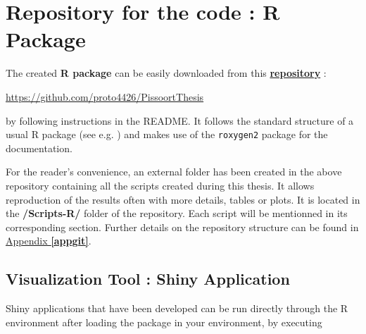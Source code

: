 \section*{Repository for the code : R Package}

The created \textbf{R package} can be easily downloaded from this \href{https://github.com/proto4426/PissoortThesis}{\textbf{repository}} :
\begin{center}\label{xxx}
 \url{https://github.com/proto4426/PissoortThesis}
\end{center}
by following instructions in the README. It follows the standard structure of a usual R package (see e.g. \citet{leisch_creating_2008}) and makes use of the \texttt{roxygen2} package for the documentation.

For the reader's convenience, an external folder has been created in the above repository containing all the scripts created during this thesis. It allows reproduction of the results often with more details, tables or plots. It is located in the \textbf{/Scripts-R/} folder of the repository. Each script will be mentionned in its corresponding section. Further details on the repository structure can be found in \hyperref[appgit]{Appendix \textbf{\ref{appgit}}}.

\subsection*{Visualization Tool : Shiny Application}

Shiny applications that have been developed can be run directly through the R environment after loading the package in your environment, by executing 

